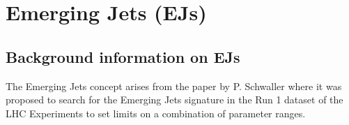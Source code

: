 \chapter{Emerging Jets (EJs) \label{ch:emj}}


\section{Background information on EJs}

The Emerging Jets concept arises from the paper by P. Schwaller \cite{Schwaller:2015gea} where it was proposed to search for the Emerging Jets signature in the Run 1 dataset of the LHC Experiments to set limits on a combination of parameter ranges.
